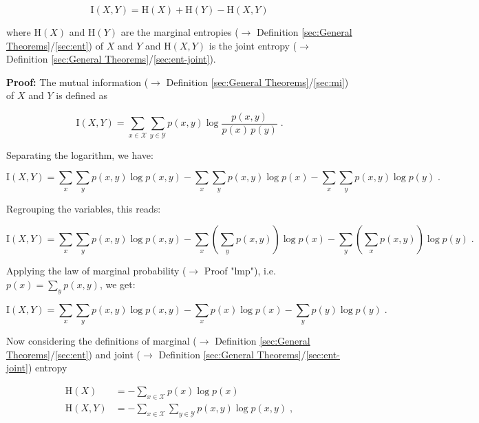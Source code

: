 \documentclass[a4paper,12pt]{book}
\begin{document}
\begin{equation} \label{eq:dmi-mje-dmi-mje}
\mathrm{I}(X,Y) = \mathrm{H}(X) + \mathrm{H}(Y) - \mathrm{H}(X,Y)
\end{equation}

where $\mathrm{H}(X)$ and $\mathrm{H}(Y)$ are the marginal entropies ($\rightarrow$ Definition \ref{sec:General Theorems}/\ref{sec:ent}) of $X$ and $Y$ and $\mathrm{H}(X,Y)$ is the joint entropy ($\rightarrow$ Definition \ref{sec:General Theorems}/\ref{sec:ent-joint}).


\vspace{1em}
\textbf{Proof:} The mutual information ($\rightarrow$ Definition \ref{sec:General Theorems}/\ref{sec:mi}) of $X$ and $Y$ is defined as

\begin{equation} \label{eq:dmi-mje-MI}
\mathrm{I}(X,Y) = \sum_{x \in \mathcal{X}} \sum_{y \in \mathcal{Y}} p(x,y) \log \frac{p(x,y)}{p(x)\,p(y)} \; .
\end{equation}

Separating the logarithm, we have:

\begin{equation} \label{eq:dmi-mje-MI-s1}
\mathrm{I}(X,Y) = \sum_x \sum_y p(x,y) \log p(x,y) - \sum_x \sum_y p(x,y) \log p(x) - \sum_x \sum_y p(x,y) \log p(y) \; .
\end{equation}

Regrouping the variables, this reads:

\begin{equation} \label{eq:dmi-mje-MI-s2}
\mathrm{I}(X,Y) = \sum_x \sum_y p(x,y) \log p(x,y) - \sum_x \left( \sum_y p(x,y) \right) \log p(x) - \sum_y \left( \sum_x p(x,y) \right) \log p(y) \; .
\end{equation}

Applying the law of marginal probability ($\rightarrow$ Proof "lmp"), i.e. $p(x) = \sum_y p(x,y)$, we get:

\begin{equation} \label{eq:dmi-mje-MI-s3}
\mathrm{I}(X,Y) = \sum_x \sum_y p(x,y) \log p(x,y) - \sum_x p(x) \log p(x) - \sum_y p(y) \log p(y) \; .
\end{equation}

Now considering the definitions of marginal ($\rightarrow$ Definition \ref{sec:General Theorems}/\ref{sec:ent}) and joint ($\rightarrow$ Definition \ref{sec:General Theorems}/\ref{sec:ent-joint}) entropy

\begin{equation} \label{eq:dmi-mje-ME-JE}
\begin{split}
\mathrm{H}(X) &= - \sum_{x \in \mathcal{X}} p(x) \log p(x) \\
\mathrm{H}(X,Y) &= - \sum_{x \in \mathcal{X}} \sum_{y \in \mathcal{Y}} p(x,y) \log p(x,y) \; ,
\end{split}
\end{equation}
\end{document}
